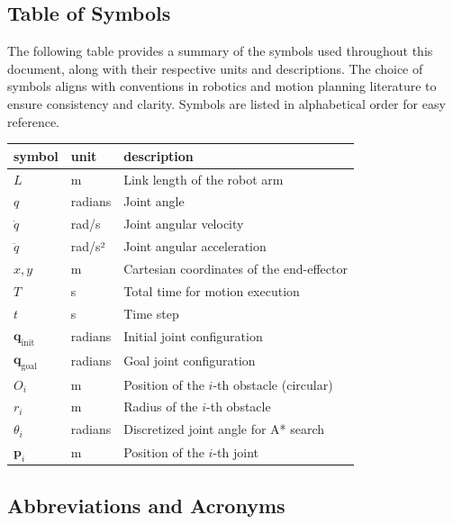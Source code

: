 \documentclass[12pt]{article}
\begin{document}
\subsection{Table of Symbols}

The following table provides a summary of the symbols used throughout this document, along with their respective units and descriptions. The choice of symbols aligns with conventions in robotics and motion planning literature to ensure consistency and clarity. Symbols are listed in alphabetical order for easy reference.

\renewcommand{\arraystretch}{1.2}
\noindent \begin{longtable*}{l l p{12cm}} \toprule
\textbf{symbol} & \textbf{unit} & \textbf{description}\\
\midrule 
\( L \) & \si{\metre} & Link length of the robot arm \\
\( q \) & radians & Joint angle \\
\( \dot{q} \) & rad/s & Joint angular velocity \\
\( \ddot{q} \) & rad/s² & Joint angular acceleration \\
\( x, y \) & \si{\metre} & Cartesian coordinates of the end-effector \\
\( T \) & \si{\second} & Total time for motion execution \\
\( t \) & \si{\second} & Time step \\
\( \mathbf{q}_{\text{init}} \) & radians & Initial joint configuration \\
\( \mathbf{q}_{\text{goal}} \) & radians & Goal joint configuration \\
\( O_i \) & \si{\metre} & Position of the \(i\)-th obstacle (circular) \\
\( r_i \) & \si{\metre} & Radius of the \(i\)-th obstacle \\
\( \theta_i \) & radians & Discretized joint angle for A* search \\
\( \mathbf{p}_i \) & \si{\metre} & Position of the \(i\)-th joint \\

\bottomrule
\end{longtable*}


\subsection{Abbreviations and Acronyms}
\end{document}
